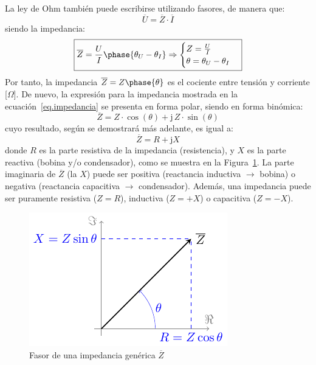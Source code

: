 La ley de Ohm también puede escribirse utilizando fasores, de manera
que:
\begin{equation}\label{eq.ohm_generalizada}
  \boxed{ \overline{U}=\overline{Z}\cdot\overline{I} }
\end{equation}
siendo la impedancia:
\begin{equation}\label{eq.impedancia}
  \boxed{\overline{Z} = \frac{U}{I}\phase{\theta_U - \theta_I} \Rightarrow 
    \begin{cases}
      Z = \frac{U}{I}\\
      \theta = \theta_U - \theta_I
    \end{cases}}
\end{equation}
Por tanto, la impedancia $\overline{Z}=Z\phase{\theta}$ es el cociente
entre tensión y corriente [$\Omega$]. De nuevo, la expresión para la
impedancia mostrada en la ecuación~\eqref{eq.impedancia} se presenta
en forma polar, siendo en forma binómica:
\begin{equation*}
  \overline{Z} = Z\cdot\cos(\theta)+\mathrm{j}\,Z\cdot\sin(\theta) %
\end{equation*}
cuyo resultado, según se demostrará más adelante, es igual a:
\begin{equation}
  \boxed{\overline{Z} =  R + \mathrm{j} X}
\end{equation}
donde $R$ es la parte resistiva de la impedancia (resistencia), y $X$
es la parte reactiva (bobina y/o condensador), como se muestra en la
Figura~\ref{fig.fasorimpedancia}. La parte imaginaria de
$\overline{Z}$ (la $X$) puede ser positiva (reactancia inductiva
$\rightarrow$ bobina) o negativa (reactancia capacitiva $\rightarrow$
condensador). Además, una impedancia puede ser puramente resistiva
($Z=R$), inductiva ($Z=+X$) o capacitiva ($Z=-X$).
\begin{figure}[H]
  \centering \includegraphics{../figs/fasorImpedancia.pdf}
  \caption{Fasor de una impedancia genérica $\overline{Z}$}
  \label{fig.fasorimpedancia}
\end{figure}
	
